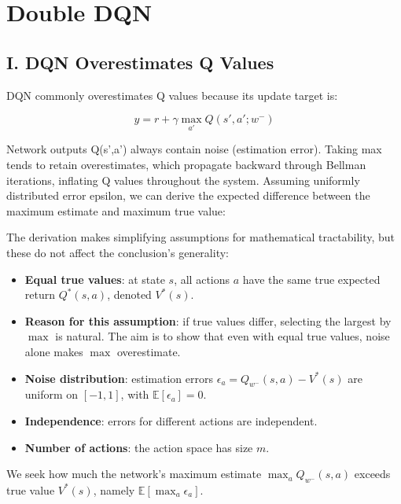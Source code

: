 \setcounter{section}{5}

\hypertarget{double-dqn}{%
\section{Double DQN}\label{double-dqn}}

\hypertarget{i.-dqn-overestimates-q-values}{%
\subsection{I. DQN Overestimates Q Values}\label{i.-dqn-overestimates-q-values}}

DQN commonly overestimates Q values because its update target is:

\[
y=r+\gamma\max_{a'}Q(s',a';w^{-})
\]

Network outputs Q(s',a') always contain noise (estimation error). Taking max tends to retain overestimates, which propagate backward through Bellman iterations, inflating Q values throughout the system. Assuming uniformly distributed error epsilon, we can derive the expected difference between the maximum estimate and maximum true value:

The derivation makes simplifying assumptions for mathematical tractability, but these do not affect the conclusion's generality:

\begin{itemize}
\tightlist
\item
  \textbf{Equal true values}: at state \(s\), all actions \(a\) have the same true expected return \(Q^{*}(s,a)\), denoted \(V^{*}(s)\).
\item
  \textbf{Reason for this assumption}: if true values differ, selecting the largest by \(\max\) is natural. The aim is to show that even with equal true values, noise alone makes \(\max\) overestimate.
\item
  \textbf{Noise distribution}: estimation errors \(\epsilon_a=Q_{w^{-}}(s,a)-V^{*}(s)\) are uniform on \([-1,1]\), with \(\mathbb{E}[\epsilon_a]=0\).
\item
  \textbf{Independence}: errors for different actions are independent.
\item
  \textbf{Number of actions}: the action space has size \(m\).
\end{itemize}

We seek how much the network's maximum estimate \(\max_a Q_{w^{-}}(s,a)\) exceeds true value \(V^{*}(s)\), namely \(\mathbb{E}[\max_a\epsilon_a]\).

